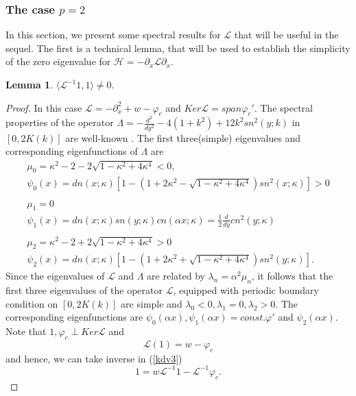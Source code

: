 \documentclass[final,11pt,leqno]{amsart}
\newtheorem{lemma}{Lemma}
\begin{document}
\subsubsection{The case $p=2$}
In this section, we present some spectral results for ${\mathcal L}$ that will be useful in the sequel.  The first is a technical lemma,
that will be used to establish the simplicity of the zero eigenvalue for ${\mathcal H}=-{\partial}_x {\mathcal L} {\partial}_x$.
\begin{lemma}\label{l1}
$ {\langle {{\mathcal L}^{-1}1},{1} \rangle} \neq 0.$
\end{lemma}
\begin{proof}
In this case $\mathcal{L}=-\partial_x^2+w-\varphi_c$ and $Ker
\mathcal{L}=span \varphi_c'$. The spectral properties of the
operator  $\Lambda=-\frac{d^2}{dy^2}-4(1+k^2)+12k^2sn^2(y;k)$ in
$[0,2K(k)]$ are well-known \cite{HIK}. The first three(simple)
eigenvalues and corresponding eigenfunctions of $\Lambda$ are
  $$\begin{array}{ll}
    \mu_0=\kappa^2-2-2\sqrt{1-\kappa^2+4\kappa^4}<0, \\
    \psi_0(x)=dn( x;\kappa)[1-(1+2\kappa^2-\sqrt{1-\kappa^2+4\kappa^4})sn^2( x;\kappa)]>0\\
    \\
    \mu_1=0\\
    \psi_1(x)=dn( x;\kappa)sn(y;\kappa)cn(\alpha x;\kappa)={\frac{1}{2}}{\frac{d}{dy}}cn^2(y;\kappa)\\
    \\
    \mu_2=\kappa^2-2+2\sqrt{1-\kappa^2+4\kappa^4}>0\\
    \psi_2(x)=dn( x;\kappa)[1-(1+2\kappa^2+\sqrt{1-\kappa^2+4\kappa^4})sn^2(y;\kappa)].
   \end{array}
  $$
  Since the eigenvalues of $\mathcal{L}$ and $\Lambda$ are related by
  $\lambda_n=\alpha^2 \mu_n$, it follows that the first three eigenvalues of the operator
      $\mathcal{L}$, equipped with periodic boundary condition on $[0,2K(k)]$
      are simple and $\lambda_0<0, \lambda_1=0, \lambda_2>0$. The
      corresponding eigenfunctions are $\psi_0(\alpha x),
      \psi_1(\alpha x)=const. \varphi'$ and $\psi_2(\alpha x)$.
Note that $1, \varphi_c \perp Ker \mathcal{L}$ and
  \begin{equation}\label{kdv3}
    \mathcal{L}(1)=w-\varphi_c
  \end{equation}
and hence, we can take inverse in (\ref{kdv3})
  \begin{equation}\label{kdv4}
    1=w\mathcal{L}^{-1}1-\mathcal{L}^{-1}\varphi_c.

\end{equation}
\end{proof}
\end{document}
